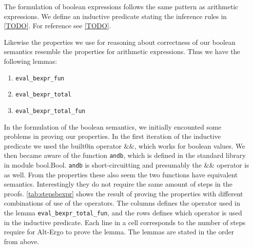 The formulation of boolean expressions follows the same pattern as arithmetic expressions.
We define an inductive predicate stating the inference rules in \autoref{TODO}.
For reference see \autoref{TODO}.

Likewise the properties we use for reasoning about correctness of our boolean semantics resemble the properties for arithmetic expressions. Thus we have the following lemmas:

\begin{enumerate}
  \item \texttt{eval\_bexpr\_fun}
  \item \texttt{eval\_bexpr\_total}
  \item \texttt{eval\_bexpr\_total\_fun}
\end{enumerate}

In the formulation of the boolean semantics, we initially encounted some problems in proving our properties.
In the first iteration of the inductive predicate we used the built0in operator \&\&, which works for boolean values.
We then became aware of the function \texttt{andb}, which is defined in the standard library in module bool.Bool.
\texttt{andb} is short-circuitting and presumably the \&\& operator is as well.
From the properties these also
seem the two functions have equivalent semantics.
Interestingly they do not require the same amount of steps in
the proofs. \autoref{tab:stepsbexpr} shows the result of proving the properties with different combinations of
use of the operators.
The columns defines the operator used in the lemma \texttt{eval\_bexpr\_total\_fun},
and the rows defines which operator is used in the inductive predicate.
Each line in a cell corresponds to the number of steps require for Alt-Ergo to prove the lemma.
The lemmas are stated in the order from above.

